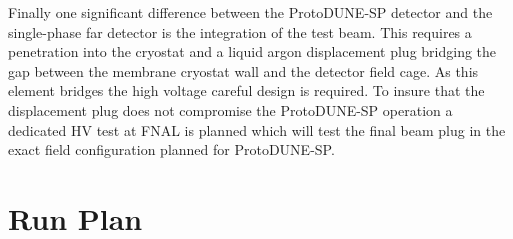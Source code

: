 Finally one significant difference between the ProtoDUNE-SP detector and the single-phase far detector is the integration of the test beam. This requires a penetration into the cryostat and a liquid argon displacement plug bridging the gap between the membrane cryostat wall and the detector field cage. As this element bridges the high voltage careful design is required. To insure that the displacement plug does not compromise the ProtoDUNE-SP operation a dedicated HV test at FNAL is planned which will test the final beam plug in the exact field configuration planned for ProtoDUNE-SP.

\section{Run Plan}
\label{sec:runplan}


